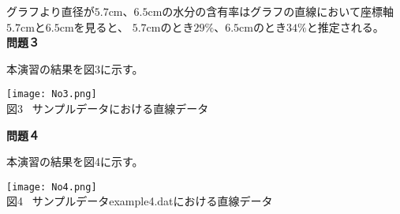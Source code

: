 \documentclass[a4]{jarticle}
\begin{document}
グラフより直径が$5.7\mathrm{cm}、6.5\mathrm{cm}$の水分の含有率はグラフの直線において座標軸$5.7\mathrm{cm}$と$6.5\mathrm{cm}$を見ると、
$5.7\mathrm{cm}$のとき$29\mathrm{\%}$、$6.5\mathrm{cm}$のとき$34\mathrm{\%}$と推定される。\\

{\bf 問題３}

本演習の結果を図3に示す。

\begin{center}
\texttt{[image: No3.png]} \\
図3 \ サンプルデータにおける直線データ
\end{center}

{\bf 問題４}

本演習の結果を図4に示す。

\begin{center}
\texttt{[image: No4.png]} \\
図4 \ サンプルデータexample4.datにおける直線データ
\end{center}
\end{document}
